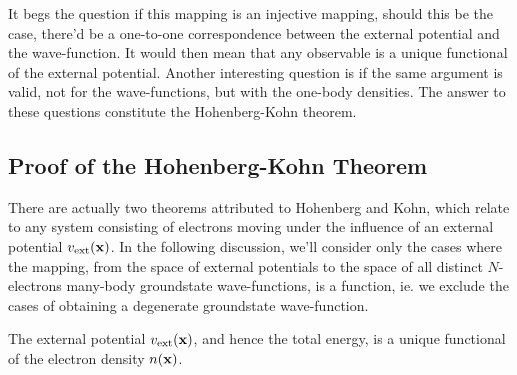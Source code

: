 \documentclass{homework}
\begin{document}
It begs the question if this mapping is an injective mapping, should this be the case, there'd be a one-to-one correspondence between the external potential and the wave-function. It would then mean that any observable is a unique functional of the external potential. Another interesting question is if the same argument is valid, not for the wave-functions, but with the one-body densities. The answer to these questions constitute the Hohenberg-Kohn theorem. \\

\subsection{Proof of the Hohenberg-Kohn Theorem}

There are actually two theorems attributed to Hohenberg and Kohn, which relate to any system consisting of electrons moving under the influence of an external potential $v_{\textnormal{ext}}({\bf x})$. In the following discussion, we'll consider only the cases where the mapping, from the space of external potentials to the space of all distinct $N$-electrons many-body groundstate wave-functions, is a function, ie. we exclude the cases of obtaining a degenerate groundstate wave-function. \\

\begin{theo}
The external potential $v_{\textnormal{ext}}({\bf x})$, and hence the total energy, is a unique functional of the electron density $n({\bf x})$.
\end{theo}
\end{document}
